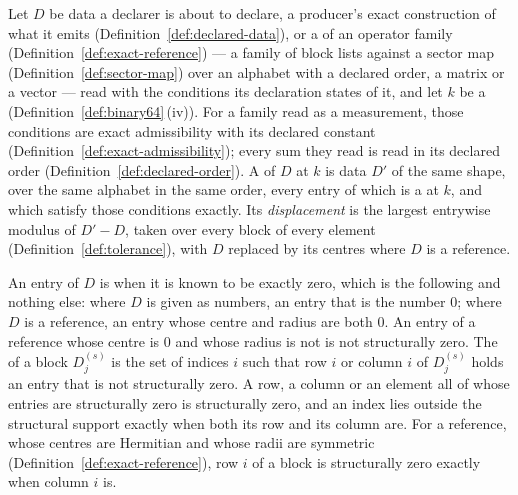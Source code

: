 \begin{definition}\label{def:snap}
Let $D$ be data a declarer is about to declare, a producer's exact
construction of what it emits (Definition~\ref{def:declared-data}), or a
 of an operator family (Definition~\ref{def:exact-reference})
--- a family of block lists against a sector map
(Definition~\ref{def:sector-map}) over an alphabet with a declared order, a
matrix or a vector --- read with the conditions its declaration states of it,
and let $k$ be a 
(Definition~\ref{def:binary64}\,(iv)). For a family read as a measurement,
those conditions are exact admissibility with its declared constant
(Definition~\ref{def:exact-admissibility}); every sum they read is read in its
declared order (Definition~\ref{def:declared-order}). A  of $D$ at
$k$ is data $D'$ of the same shape, over the same alphabet in the same order,
every entry of which is a  at $k$, and which satisfy those
conditions exactly. Its \emph{displacement} is the largest entrywise modulus
of $D'-D$, taken over every block of every element
(Definition~\ref{def:tolerance}), with $D$ replaced by its centres where $D$
is a reference.

An entry of $D$ is
 when
it is known to be exactly zero, which is the following and nothing else: where
$D$ is given as numbers, an entry that is the number $0$; where $D$ is a
reference, an entry whose centre and radius are both $0$. An entry of a
reference whose centre is $0$ and whose radius is not is not structurally
zero. The
 of a block
$D^{(s)}_j$ is the set of indices $i$ such that row $i$ or column $i$ of
$D^{(s)}_j$ holds an entry that is not structurally zero. A row, a column or
an element all of whose entries are structurally zero is structurally zero,
and an index lies outside the structural support exactly when both its row
and its column are. For a reference, whose centres are Hermitian and whose
radii are symmetric (Definition~\ref{def:exact-reference}), row $i$ of a block
is structurally zero exactly when column $i$ is.


\end{definition}
